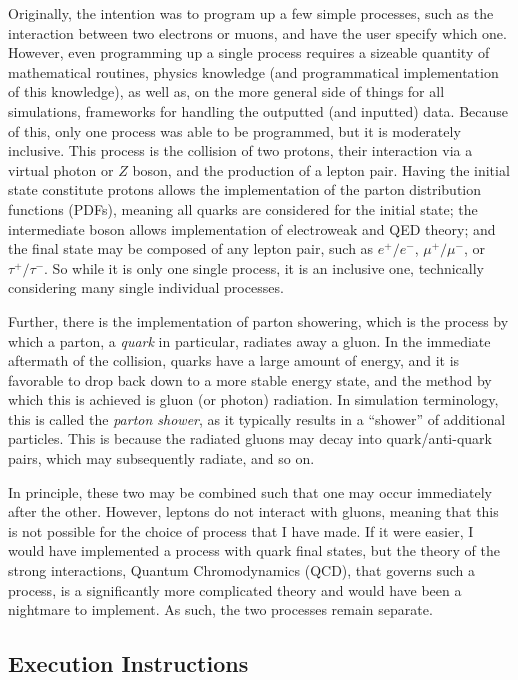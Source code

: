 Originally, the intention was to program up a few simple processes, such as the interaction between two electrons or muons, and have the user specify which one. However, even programming up a single process requires a sizeable quantity of mathematical routines, physics knowledge (and programmatical implementation of this knowledge), as well as, on the more general side of things for all simulations, frameworks for handling the outputted (and inputted) data. Because of this, only one process was able to be programmed, but it is moderately inclusive. This process is the collision of two protons, their interaction via a virtual photon or $Z$ boson, and the production of a lepton pair. Having the initial state constitute protons allows the implementation of the parton distribution functions (PDFs), meaning all quarks are considered for the initial state; the intermediate boson allows implementation of electroweak and QED theory; and the final state may be composed of any lepton pair, such as $e^+/e^-$, $\mu^+/\mu^-$, or $\tau^+/\tau^-$. So while it is only one single process, it is an inclusive one, technically considering many single individual processes.

Further, there is the implementation of parton showering, which is the process by which a parton, a \textit{quark} in particular, radiates away a gluon. In the immediate aftermath of the collision, quarks have a large amount of energy, and it is favorable to drop back down to a more stable energy state, and the method by which this is achieved is gluon (or photon) radiation. In simulation terminology, this is called the \textit{parton shower}, as it typically results in a ``shower'' of additional particles. This is because the radiated gluons may decay into quark/anti-quark pairs, which may subsequently radiate, and so on.

In principle, these two may be combined such that one may occur immediately after the other. However, leptons do not interact with gluons, meaning that this is not possible for the choice of process that I have made. If it were easier, I would have implemented a process with quark final states, but the theory of the strong interactions, Quantum Chromodynamics (QCD), that governs such a process, is a significantly more complicated theory and would have been a nightmare to implement. As such, the two processes remain separate.


\subsection{Execution Instructions}

